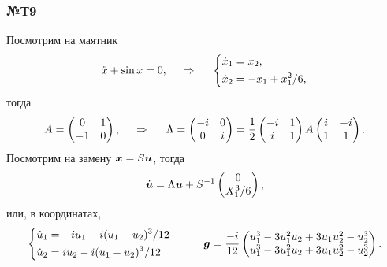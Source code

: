 \subsubsection*{№Т9}


Посмотрим на маятник
\begin{equation*}
    \ddot{x} + \sin x = 0,
    \hspace{0.5cm} \Rightarrow \hspace{0.5cm}
    \left\{\begin{aligned}
        \dot{x}_1 &= x_2, \\
        \dot{x}_2 &= -x_1 + x_1^2/6,
    \end{aligned}\right.
\end{equation*}
тогда
\begin{equation*}
    A = \begin{pmatrix}
        0 & 1 \\
        -1 & 0 \\
    \end{pmatrix},
    \hspace{0.5cm} \Rightarrow \hspace{0.5cm}
    \Lambda = \begin{pmatrix}
        -i & 0 \\
        0 & i \\
    \end{pmatrix} = 
    \frac{1}{2}
    \begin{pmatrix}
        -i & 1 \\
        i & 1 \\
    \end{pmatrix}
    A
    \begin{pmatrix}
        i & -i \\
        1 & 1 \\
    \end{pmatrix}.
\end{equation*}
Посмотрим на замену $\mbox{\boldmath $x$} = S \mbox{\boldmath $u$}$, тогда
\begin{equation*}
    \dot{\mbox{\boldmath $u$}} = \Lambda \mbox{\boldmath $u$} + S^{-1} \begin{pmatrix}
        0 \\ X_1^3/6
    \end{pmatrix},
\end{equation*}
или, в координатах,
\begin{equation*}
    \left\{\begin{aligned}
        \dot{u}_1 &= - i u_1 - i (u_1-u_2)^3/12 \\
        \dot{u}_2 &= i u_2 - i (u_1 - u_2)^3/12
    \end{aligned}\right.
    \hspace{1 cm}
    \mbox{\boldmath $g$} = \frac{-i}{12}
    \begin{pmatrix}
        u_1^3 - 3 u_1^2 u_2 + 3 u_1 u_2^2 - u_2^3 \\
        u_1^3 - 3 u_1^2 u_2 + 3 u_1 u_2^2 - u_2^3 
    \end{pmatrix}.
\end{equation*}
